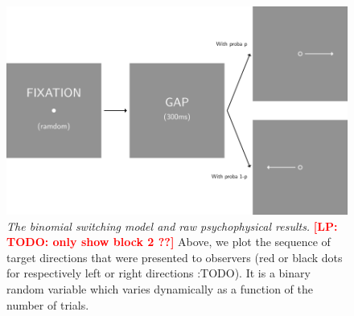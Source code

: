 \documentclass[profile,final,english,draft]{article}%
\newcommand{\LP}[1]{\textbf{\textcolor{red}{[LP: #1]}}}
\begin{document}
\begin{figure}%
\begin{center}
\includegraphics[width=\linewidth]{figure2}
\end{center}
\caption{
\emph{The binomial switching model and raw psychophysical results.}%
%
\LP{TODO: only show block 2 ??}
Above, we plot the sequence of target directions
that were presented to observers
(red or black dots for respectively left or right directions :TODO).
It is a binary random variable which varies dynamically
as a function of the number of trials.
}
\end{figure}
\end{document}
